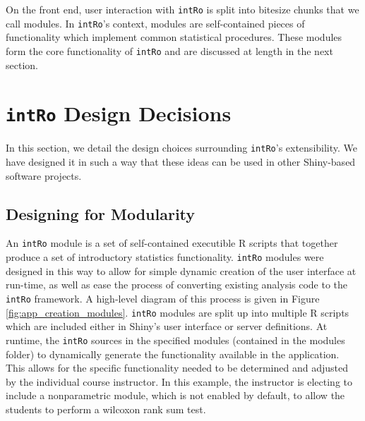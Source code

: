 \documentclass[12pt,]{article}
\begin{document}
On the front end, user interaction with \texttt{intRo} is split into
bitesize chunks that we call modules. In \texttt{intRo}'s context,
modules are self-contained pieces of functionality which implement
common statistical procedures. These modules form the core functionality
of \texttt{intRo} and are discussed at length in the next section.

\section{\texorpdfstring{\texttt{intRo} Design
Decisions}{intRo Design Decisions}}\label{intro-design-decisions}

In this section, we detail the design choices surrounding
\texttt{intRo}'s extensibility. We have designed it in such a way that
these ideas can be used in other Shiny-based software projects.

\subsection{Designing for Modularity}\label{designing-for-modularity}

An \texttt{intRo} module is a set of self-contained executible R scripts
that together produce a set of introductory statistics functionality.
\texttt{intRo} modules were designed in this way to allow for simple
dynamic creation of the user interface at run-time, as well as ease the
process of converting existing analysis code to the \texttt{intRo}
framework. A high-level diagram of this process is given in Figure
\ref{fig:app_creation_modules}. \texttt{intRo} modules are split up into
multiple R scripts which are included either in Shiny's user interface
or server definitions. At runtime, the \texttt{intRo} sources in the
specified modules (contained in the modules folder) to dynamically
generate the functionality available in the application. This allows for
the specific functionality needed to be determined and adjusted by the
individual course instructor. In this example, the instructor is
electing to include a nonparametric module, which is not enabled by
default, to allow the students to perform a wilcoxon rank sum test.
\end{document}
